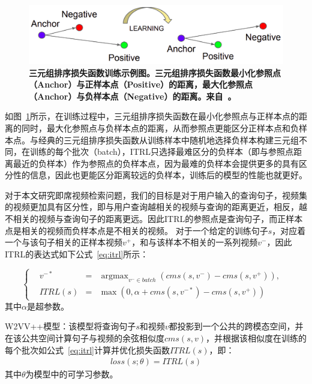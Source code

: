 \begin{figure}[tbh!]
    \centering
    \includegraphics[width=\linewidth]{figures/triplet-ranking-loss}
    \caption[三元组排序损失函数训练示例图]{\textbf{三元组排序损失函数训练示例图。三元组排序损失函数最小化参照点（Anchor）与正样本点（Positive）的距离，最大化参照点（Anchor）与负样本点（Negative）的距离。来自~\cite{schroff2015facenet}。}}
    \label{fig:triplet-ranking-loss}
\end{figure}

如图~\ref{fig:triplet-ranking-loss}所示，在训练过程中，三元组排序损失函数在最小化参照点与正样本点的距离的同时，最大化参照点与负样本点的距离，从而参照点更能区分正样本点和负样本点。与经典的三元组排序损失函数从训练样本中随机地选择负样本构建三元组不同，在训练的每个批次（batch），ITRL只选择最难区分的负样本（即与参照点距离最近的负样本）作为参照点的负样本点，因为最难的负样本会提供更多的具有区分性的信息，因此也更能区分距离较远的负样本，训练后的模型的性能也就更好。

对于本文研究即席视频检索问题，我们的目标是对于用户输入的查询句子，视频集的视频更加具有区分性，即与用户查询越相关的视频与查询的距离更近，相反，越不相关的视频与查询句子的距离更远。因此ITRL的参照点是查询句子，而正样本点是相关的视频而负样本点是不相关的视频。
对于一个给定的训练句子$s$，对应着一个与该句子相关的正样本视频$v^+$，和与该样本不相关的一系列视频$v^-$，因此ITRL的表达式如下公式~\ref{eq:itrl}所示：

\begin{equation}
    \label{eq:itrl}
    \left\{
        \begin{aligned}
            & v^{-*} & = & \mathop{\arg\max}_{v^- \in batch}(cms(s, v^-) - cms(s, v^+)), & \\
            & ITRL(s) & = & \max(0, \alpha + cms(s, v^{-*}) - cms(s, v^+)) &
        \end{aligned}
    \right.
\end{equation}
其中$\alpha$是超参数。

W2VV++模型：该模型将查询句子$s$和视频$v$都投影到一个公共的跨模态空间，并在该公共空间计算句子与视频的余弦相似度$cms(s,v)$，并根据该相似度在训练的每个批次如公式~\ref{eq:itrl}计算并优化损失函数$ITRL(s)$，即：
\begin{equation}
    \label{eq:loss-w2vv++}
    \begin{aligned}
        loss(s;\theta) = ITRL(s)
    \end{aligned}
\end{equation}
其中$\theta$为模型中的可学习参数。

